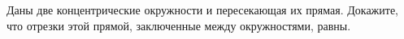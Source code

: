 \begin{ex}
	\begin{condition}
		Даны две концентрические окружности и пересекающая их прямая. Докажите, что отрезки этой прямой, заключенные между окружностями, равны.
	\end{condition}
\end{ex}